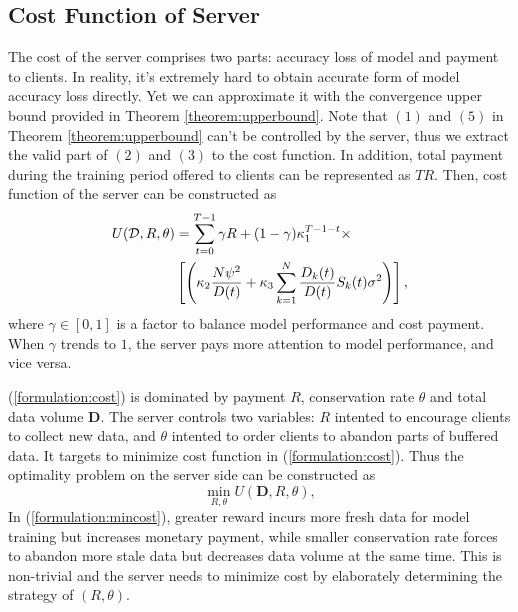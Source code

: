 \documentclass{article}
\theoremstyle{plain}
\theoremstyle{definition}
\theoremstyle{remark}
\begin{document}
\subsection{Cost Function of Server}
\label{section:cost function}
The cost of the server comprises two parts: accuracy loss of model and payment to clients. 
In reality, it's extremely hard to obtain accurate form of model accuracy loss directly. Yet we can approximate it with the convergence upper bound provided in Theorem \ref{theorem:upperbound}.
Note that $(1)$ and $(5)$ in Theorem \ref{theorem:upperbound} can't be controlled by the server, thus we extract the valid part of $(2)$ and $(3)$ to the cost function.
In addition, total payment during the training period offered to clients can be represented as $TR$.
Then, cost function of the server can be constructed as
\begin{align}
  \label{formulation:cost}
  U(\mathcal{D}, R, \theta) & = \sum_{t=0}^{T-1} \gamma R + (1-\gamma)\kappa_1^{T-1-t} \times \\
  & \left[\left(\kappa_2 \frac{N\psi^2}{D(t)} + \kappa_3 \sum_{k=1}^{N} \frac{D_k(t)}{D(t)} S_k(t) \sigma^2 \right) \right], \notag
\end{align}
where $\gamma \in [0, 1]$ is a factor to balance model performance and cost payment. When $\gamma$ trends to $1$, the server pays more attention to model performance, and vice versa.

(\ref{formulation:cost}) is dominated by payment $R$, conservation rate $\theta$ and total data volume $\boldsymbol{D}$.
The server controls two variables: $R$ intented to encourage clients to collect new data, and $\theta$ intented to order clients to abandon parts of buffered data.
It targets to minimize cost function in (\ref{formulation:cost}). Thus the optimality problem on the server side can be constructed as 
\begin{equation}
  \label{formulation:mincost}
  \min_{R,\theta}  U(\boldsymbol{D}, R, \theta), 
\end{equation}
In (\ref{formulation:mincost}), greater reward incurs more fresh data for model training but increases monetary payment, while smaller conservation rate forces to abandon more stale data but decreases data volume at the same time. This is non-trivial and the server needs to minimize cost by elaborately determining the strategy of $(R, \theta)$.
\end{document}
